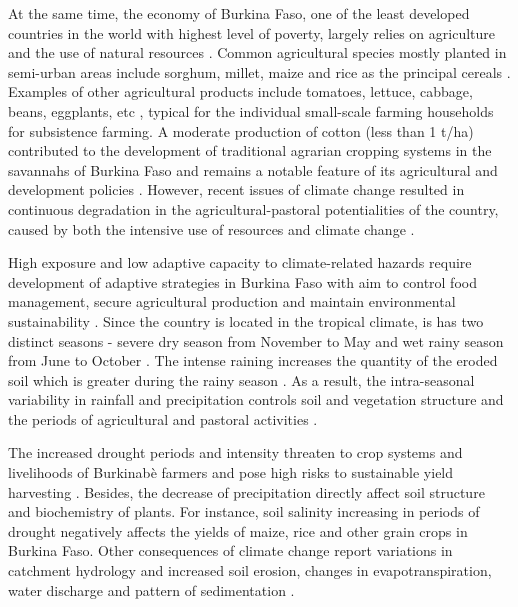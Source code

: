 \documentclass[atmosphere,article,submit,pdftex,moreauthors]{Definitions/mdpi}
\begin{document}
At the same time, the economy of Burkina Faso, one of the least developed countries in the world with highest level of poverty, largely relies on agriculture and the use of natural resources \cite{1525946}. Common agricultural species mostly planted in semi-urban areas include sorghum, millet, maize and rice as the principal cereals \cite{SEOGO2023106475,ARUMUGAM2023126655}. Examples of other agricultural products include tomatoes, lettuce, cabbage, beans, eggplants, etc \cite{Ouedraogo2019}, typical for the individual small-scale farming households for subsistence farming. A moderate production of cotton (less than 1 t/ha) contributed to the development of traditional agrarian cropping systems in the savannahs of Burkina Faso and remains a notable feature of its agricultural and development policies \cite{Soumare}. However, recent issues of climate change resulted in continuous degradation in the agricultural-pastoral potentialities of the country, caused by both the intensive use of resources \cite{Vall} and climate change \cite{DIMOBE2022126299}. 

High exposure and low adaptive capacity to climate-related hazards require development of adaptive strategies in Burkina Faso with aim to control food management, secure agricultural production and maintain environmental sustainability \cite{BUNCLARK2018243,daniel2013farming}. Since the country is located in the tropical climate, is has two distinct seasons - severe dry season from November to May and wet rainy season from June to October \cite{OFORISARPONG1987179}. The intense raining increases the quantity of the eroded soil which is greater during the rainy season \cite{Sanou}. As a result, the intra-seasonal variability in rainfall and precipitation controls soil and vegetation structure and the periods of agricultural and pastoral activities \cite{brons2000climate}. 

The increased drought periods and intensity threaten to crop systems and livelihoods of Burkinabè farmers and pose high risks to sustainable yield harvesting \cite{su142315637,salter1967crop,atmos13071155}. Besides, the decrease of precipitation directly affect soil structure and biochemistry of plants. For instance, soil salinity increasing in periods of drought negatively affects the yields of maize, rice and other grain crops in Burkina Faso. Other consequences of climate change report variations in catchment hydrology and increased soil erosion, changes in evapotranspiration, water discharge and pattern of sedimentation \cite{OPDEHIPT2019431,OPDEHIPT201863}.
\end{document}
